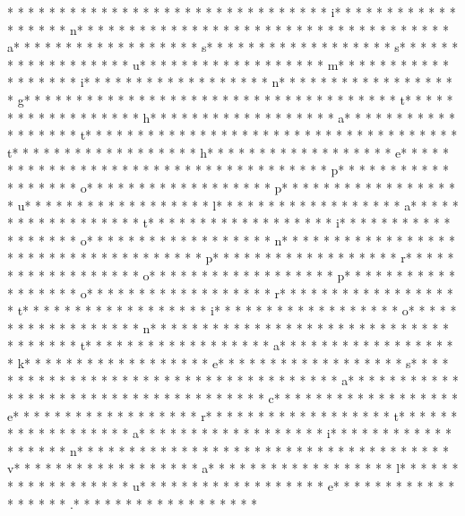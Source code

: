 *  * * *  *  * * *  *  * * *  *  * * *  * * *  * * *  *  * * *  *  * * *  * i* * *  * * *  * * *  *  * * *  *  * * *  * n* * *  * * *  * * *  *  * * *  *  * * *  *  * * *  * * *  * * *  *  * * *  *  * * *  * a* * *  * * *  * * *  *  * * *  *  * * *  * s* * *  * * *  * * *  *  * * *  *  * * *  * s* * *  * * *  * * *  *  * * *  *  * * *  * u* * *  * * *  * * *  *  * * *  *  * * *  * m* * *  * * *  * * *  *  * * *  *  * * *  * i* * *  * * *  * * *  *  * * *  *  * * *  * n* * *  * * *  * * *  *  * * *  *  * * *  * g* * *  * * *  * * *  *  * * *  *  * * *  *  * * *  * * *  * * *  *  * * *  *  * * *  * t* * *  * * *  * * *  *  * * *  *  * * *  * h* * *  * * *  * * *  *  * * *  *  * * *  * a* * *  * * *  * * *  *  * * *  *  * * *  * t* * *  * * *  * * *  *  * * *  *  * * *  *  * * *  * * *  * * *  *  * * *  *  * * *  * t* * *  * * *  * * *  *  * * *  *  * * *  * h* * *  * * *  * * *  *  * * *  *  * * *  * e* * *  * * *  * * *  *  * * *  *  * * *  *  * * *  * * *  * * *  *  * * *  *  * * *  * p* * *  * * *  * * *  *  * * *  *  * * *  * o* * *  * * *  * * *  *  * * *  *  * * *  * p* * *  * * *  * * *  *  * * *  *  * * *  * u* * *  * * *  * * *  *  * * *  *  * * *  * l* * *  * * *  * * *  *  * * *  *  * * *  * a* * *  * * *  * * *  *  * * *  *  * * *  * t* * *  * * *  * * *  *  * * *  *  * * *  * i* * *  * * *  * * *  *  * * *  *  * * *  * o* * *  * * *  * * *  *  * * *  *  * * *  * n* * *  * * *  * * *  *  * * *  *  * * *  *  * * *  * * *  * * *  *  * * *  *  * * *  * p* * *  * * *  * * *  *  * * *  *  * * *  * r* * *  * * *  * * *  *  * * *  *  * * *  * o* * *  * * *  * * *  *  * * *  *  * * *  * p* * *  * * *  * * *  *  * * *  *  * * *  * o* * *  * * *  * * *  *  * * *  *  * * *  * r* * *  * * *  * * *  *  * * *  *  * * *  * t* * *  * * *  * * *  *  * * *  *  * * *  * i* * *  * * *  * * *  *  * * *  *  * * *  * o* * *  * * *  * * *  *  * * *  *  * * *  * n* * *  * * *  * * *  *  * * *  *  * * *  *  * * *  * * *  * * *  *  * * *  *  * * *  * t* * *  * * *  * * *  *  * * *  *  * * *  * a* * *  * * *  * * *  *  * * *  *  * * *  * k* * *  * * *  * * *  *  * * *  *  * * *  * e* * *  * * *  * * *  *  * * *  *  * * *  * s* * *  * * *  * * *  *  * * *  *  * * *  *  * * *  * * *  * * *  *  * * *  *  * * *  * a* * *  * * *  * * *  *  * * *  *  * * *  *  * * *  * * *  * * *  *  * * *  *  * * *  * c* * *  * * *  * * *  *  * * *  *  * * *  * e* * *  * * *  * * *  *  * * *  *  * * *  * r* * *  * * *  * * *  *  * * *  *  * * *  * t* * *  * * *  * * *  *  * * *  *  * * *  * a* * *  * * *  * * *  *  * * *  *  * * *  * i* * *  * * *  * * *  *  * * *  *  * * *  * n* * *  * * *  * * *  *  * * *  *  * * *  *  * * *  * * *  * * *  *  * * *  *  * * *  * v* * *  * * *  * * *  *  * * *  *  * * *  * a* * *  * * *  * * *  *  * * *  *  * * *  * l* * *  * * *  * * *  *  * * *  *  * * *  * u* * *  * * *  * * *  *  * * *  *  * * *  * e* * *  * * *  * * *  *  * * *  *  * * *  * .* * *  * * *  * * *  *  * * *  *  * * *  * 
